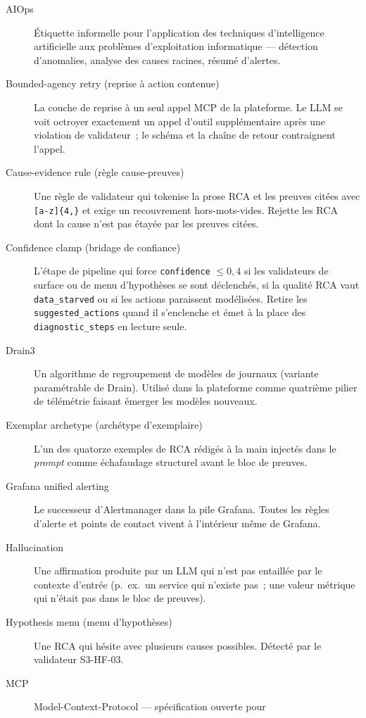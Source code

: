 \documentclass[11pt,a4paper,oneside]{report}
\begin{document}
\begin{description}
\item[AIOps] Étiquette informelle pour l'application des techniques
    d'intelligence artificielle aux problèmes d'exploitation
    informatique --- détection d'anomalies, analyse des causes
    racines, résumé d'alertes.
\item[Bounded-agency retry (reprise à action contenue)] La couche
    de reprise à un seul appel MCP de la plateforme. Le LLM se voit
    octroyer exactement un appel d'outil supplémentaire après une
    violation de validateur~; le schéma et la chaîne de retour
    contraignent l'appel.
\item[Cause-evidence rule (règle cause-preuves)] Une règle de
    validateur qui tokenise la prose RCA et les preuves citées
    avec \texttt{[a-z]\{4,\}} et exige un recouvrement
    hors-mots-vides. Rejette les RCA dont la cause n'est pas
    étayée par les preuves citées.
\item[Confidence clamp (bridage de confiance)] L'étape de pipeline
    qui force \texttt{confidence} $\leq 0{,}4$ si les validateurs
    de surface ou de menu d'hypothèses se sont déclenchés, si la
    qualité RCA vaut \texttt{data\_starved} ou si les actions
    paraissent modélisées. Retire les \texttt{suggested\_actions}
    quand il s'enclenche et émet à la place des
    \texttt{diagnostic\_steps} en lecture seule.
\item[Drain3] Un algorithme de regroupement de modèles de journaux
    (variante paramétrable de Drain). Utilisé dans la plateforme
    comme quatrième pilier de télémétrie faisant émerger les
    modèles nouveaux.
\item[Exemplar archetype (archétype d'exemplaire)] L'un des
    quatorze exemples de RCA rédigés à la main injectés dans le
    \emph{prompt} comme échafaudage structurel avant le bloc de
    preuves.
\item[Grafana unified alerting] Le successeur d'Alertmanager dans
    la pile Grafana. Toutes les règles d'alerte et points de
    contact vivent à l'intérieur même de Grafana.
\item[Hallucination] Une affirmation produite par un LLM qui n'est
    pas entaillée par le contexte d'entrée (p.~ex.\ un service qui
    n'existe pas~; une valeur métrique qui n'était pas dans le bloc
    de preuves).
\item[Hypothesis menu (menu d'hypothèses)] Une RCA qui hésite avec
    plusieurs causes possibles. Détecté par le validateur S3-HF-03.
\item[MCP] Model-Context-Protocol --- spécification ouverte pour

\end{description}
\end{document}
